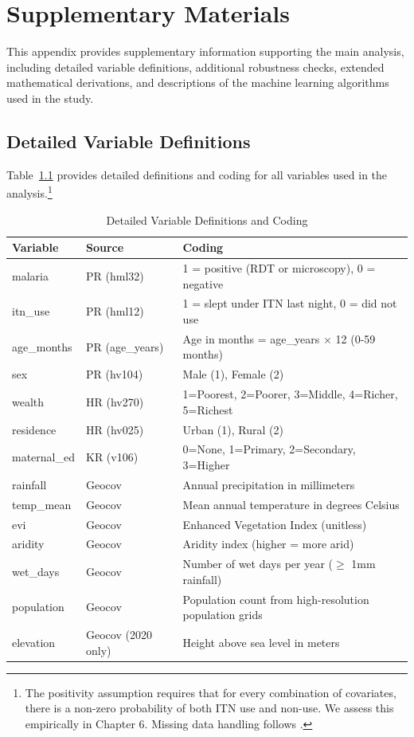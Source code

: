 \chapter{Supplementary Materials}

This appendix provides supplementary information supporting the main analysis, including detailed variable definitions, additional robustness checks, extended mathematical derivations, and descriptions of the machine learning algorithms used in the study.

\section{Detailed Variable Definitions}

Table~\ref{tab:appendix_variables} provides detailed definitions and coding for all variables used in the analysis.\footnote{The positivity assumption \citep{westreich2010invited} requires that for every combination of covariates, there is a non-zero probability of both ITN use and non-use. We assess this empirically in Chapter 6. Missing data handling follows \citet{little2019statistical}.}

\begin{table}[htbp]
	\centering
	\caption{Detailed Variable Definitions and Coding}
	\label{tab:appendix_variables}
	\begin{tabular}{@{}llp{5cm}@{}}
		\toprule
		\textbf{Variable} & \textbf{Source} & \textbf{Coding} \\
		\midrule
		malaria & PR (hml32) & 1 = positive (RDT or microscopy), 0 = negative \\
		itn\_use & PR (hml12) & 1 = slept under ITN last night, 0 = did not use \\
		age\_months & PR (age\_years) & Age in months = age\_years $\times$ 12 (0-59 months) \\
		sex & PR (hv104) & Male (1), Female (2) \\
		wealth & HR (hv270) & 1=Poorest, 2=Poorer, 3=Middle, 4=Richer, 5=Richest \\
		residence & HR (hv025) & Urban (1), Rural (2) \\
		maternal\_ed & KR (v106) & 0=None, 1=Primary, 2=Secondary, 3=Higher \\
		rainfall & Geocov & Annual precipitation in millimeters \\
		temp\_mean & Geocov & Mean annual temperature in degrees Celsius \\
		evi & Geocov & Enhanced Vegetation Index (unitless) \\
		aridity & Geocov & Aridity index (higher = more arid) \\
		wet\_days & Geocov & Number of wet days per year ($\geq$ 1mm rainfall) \\
		population & Geocov & Population count from high-resolution population grids \\
		elevation & Geocov (2020 only) & Height above sea level in meters \\
		\bottomrule
	\end{tabular}
\end{table}

